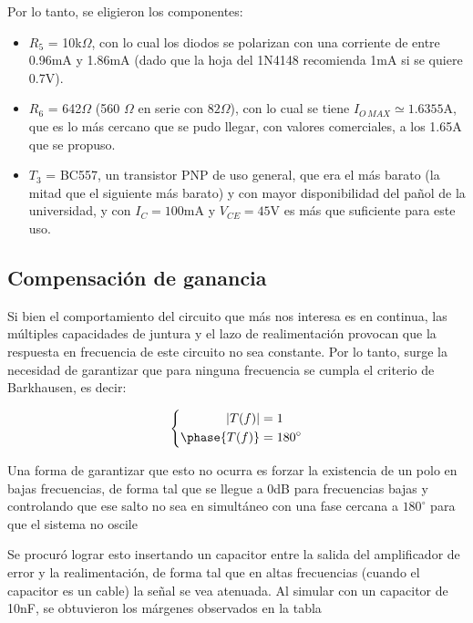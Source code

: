 \documentclass[e2_tp1_main.tex]{subfiles}
\begin{document}
Por lo tanto, se eligieron los componentes:

\begin{itemize}
	\item $R_5$ = 10k$\Omega$, con lo cual los diodos se polarizan con una corriente de entre 0.96mA y 1.86mA (dado que la hoja del 1N4148 recomienda 1mA si se quiere 0.7V).
	\item $R_6$ = 642$\Omega$ (560 $\Omega$ en serie con $82\Omega$), con lo cual se tiene $I_{O\, MAX} \simeq 1.6355$A, que es lo m\'as cercano que se pudo llegar, con valores comerciales, a los 1.65A que se propuso.
	\item $T_3$ = BC557, un transistor PNP de uso general, que era el m\'as barato (la mitad que el siguiente m\'as barato) y con mayor disponibilidad del pa\~nol de la universidad, y con $I_C = 100$mA y $V_{CE}=45$V es m\'as que suficiente para este uso.
\end{itemize}




\subsection{Compensaci\'on de ganancia}

Si bien el comportamiento del circuito que m\'as nos interesa es en continua, las m\'ultiples capacidades de juntura y el lazo de realimentaci\'on provocan que la respuesta en frecuencia de este circuito no sea constante. Por lo tanto, surge la necesidad de garantizar que para ninguna frecuencia se cumpla el criterio de Barkhausen, es decir:

\[
\left\{
\begin{aligned}
|T(f)| &= 1 \\
\phase{T(f)} &= 180^\circ
\end{aligned}
\right.
\]

Una forma de garantizar que esto no ocurra es forzar la existencia de un polo en bajas frecuencias, de forma tal que se llegue a 0dB para frecuencias bajas y controlando que ese salto no sea en simult\'aneo con una fase cercana a $180^\circ$ para que el sistema no oscile

Se procur\'o lograr esto insertando un capacitor entre la salida del amplificador de error y la realimentaci\'on, de forma tal que en altas frecuencias (cuando el capacitor es un cable) la se\~nal se vea atenuada. Al simular con un capacitor de 10nF, se obtuvieron los m\'argenes observados en la tabla \
\end{document}
